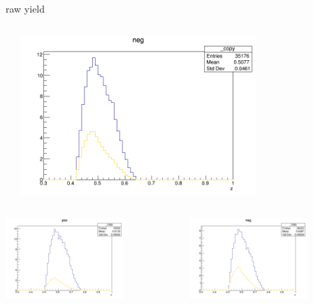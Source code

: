 \begin{frame}{raw yield}
\begin{columns}
\begin{column}[T]{0.25\textwidth}
\end{column}
\begin{column}[T]{0.25\textwidth}
\includegraphics[width = 0.7\textwidth]{results/yield/statistics/yield_x_Q2_z_0.45_4.750_0.50_neg.png}
\end{column}
\end{columns}
\begin{columns}
\begin{column}[T]{0.25\textwidth}
\includegraphics[width = 0.7\textwidth]{results/yield/statistics/yield_x_Q2_z_0.45_4.750_0.60_pos.png}
\end{column}
\begin{column}[T]{0.25\textwidth}
\includegraphics[width = 0.7\textwidth]{results/yield/statistics/yield_x_Q2_z_0.45_4.750_0.60_neg.png}

\end{column}
\end{columns}
\end{frame}
